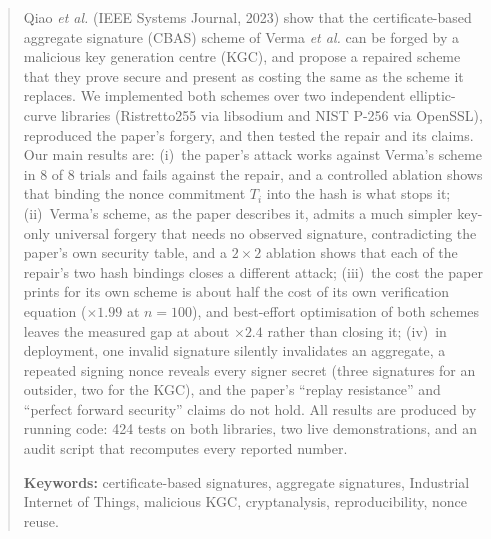 \documentclass[11pt,a4paper]{article}
\begin{document}
\begin{abstract}
\noindent Qiao \emph{et al.} (IEEE Systems Journal, 2023) show that the certificate-based aggregate
signature (CBAS) scheme of Verma \emph{et al.} can be forged by a malicious key generation centre (KGC),
and propose a repaired scheme that they prove secure and present as costing the same as the scheme it
replaces. We implemented both schemes over two independent elliptic-curve libraries (Ristretto255 via
libsodium and NIST P-256 via OpenSSL), reproduced the paper's forgery, and then tested the repair and
its claims. Our main results are: (i)~the paper's attack works against Verma's scheme in 8 of 8 trials
and fails against the repair, and a controlled ablation shows that binding the nonce commitment $T_i$
into the hash is what stops it; (ii)~Verma's scheme, as the paper describes it, admits a much simpler
key-only universal forgery that needs no observed signature, contradicting the paper's own security
table, and a $2\times2$ ablation shows that each of the repair's two hash bindings closes a different
attack; (iii)~the cost the paper prints for its own scheme is about half the cost of its own
verification equation ($\times1.99$ at $n=100$), and best-effort optimisation of both schemes leaves the
measured gap at about $\times2.4$ rather than closing it; (iv)~in deployment, one invalid signature
silently invalidates an aggregate, a repeated signing nonce reveals every signer secret (three
signatures for an outsider, two for the KGC), and the paper's ``replay resistance'' and ``perfect
forward security'' claims do not hold. All results are produced by running code: 424 tests on both
libraries, two live demonstrations, and an audit script that recomputes every reported number.

\medskip\noindent\textbf{Keywords:} certificate-based signatures, aggregate signatures, Industrial
Internet of Things, malicious KGC, cryptanalysis, reproducibility, nonce reuse.
\end{abstract}















\clearpage


\end{document}
